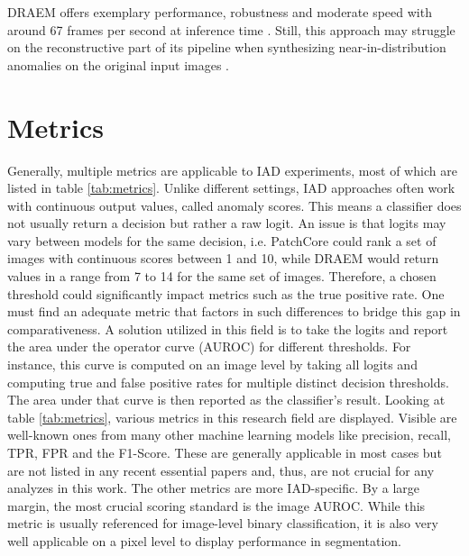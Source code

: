 DRAEM offers exemplary performance, robustness and moderate speed with around 67 frames per second at inference time \cite{liu2023simplenet}. Still, this approach may struggle on the reconstructive 
part of its pipeline when synthesizing near-in-distribution anomalies on the original input images \cite{liu2024deep}. %










\section{Metrics}
\label{sec:metrics}

Generally, multiple metrics are applicable to IAD experiments, most of which are listed in table \ref{tab:metrics}. Unlike different 
settings, IAD approaches often work with continuous output values, called anomaly scores. This means a classifier does not usually return 
a decision but rather a raw logit. An issue is that logits may vary between models for the same decision, i.e. PatchCore \cite{patchCore2022} could rank a set of images 
with continuous scores between 1 and 10, while DRAEM \cite{Zavrtanik_2021DRAEM} would return values in a range from 7 to 14 for the same 
set of images. Therefore, a chosen threshold could significantly impact metrics such as the true positive rate. One must find an adequate metric that factors in such differences to bridge this gap in comparativeness.
A solution utilized in this field is to take the logits and report the area under the operator curve (AUROC) for different thresholds. 
For instance, this curve is computed on an image level by taking all logits and computing true and false positive rates for multiple distinct 
decision thresholds. The area under that curve is then reported as the classifier's result.
\newline\newline
Looking at table \ref{tab:metrics}, various metrics in this research field are displayed. Visible are well-known 
ones from many other machine learning models like precision, recall, TPR, FPR and the F1-Score. These are generally applicable in most 
cases but are not listed in any recent essential papers and, thus, are not crucial for any analyzes in this work. The other metrics are 
more IAD-specific. By a large margin, the most crucial scoring standard is the image AUROC. While this metric is usually referenced for image-level 
binary classification, it is also very well applicable on a pixel level to display performance in segmentation. 

